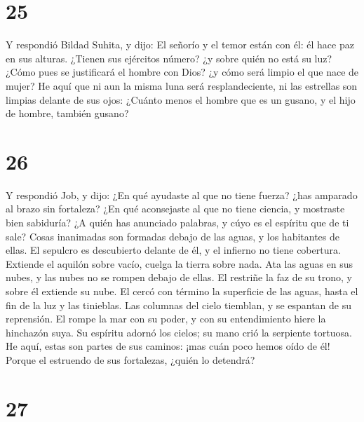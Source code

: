 \hypertarget{section-24}{%
\section{25}\label{section-24}}

 Y respondió Bildad Suhita, y dijo:  El señorío
y el temor están con él: él hace paz en sus alturas. 
¿Tienen sus ejércitos número? ¿y sobre quién no está su luz?
 ¿Cómo pues se justificará el hombre con Dios? ¿y cómo será
limpio el que nace de mujer?  He aquí que ni aun la misma
luna será resplandeciente, ni las estrellas son limpias delante de sus
ojos:  ¿Cuánto menos el hombre que es un gusano, y el hijo
de hombre, también gusano?

\hypertarget{section-25}{%
\section{26}\label{section-25}}

 Y respondió Job, y dijo:  ¿En qué ayudaste al
que no tiene fuerza? ¿has amparado al brazo sin fortaleza? 
¿En qué aconsejaste al que no tiene ciencia, y mostraste bien sabiduría?
 ¿A quién has anunciado palabras, y cúyo es el espíritu que
de ti sale?  Cosas inanimadas son formadas debajo de las
aguas, y los habitantes de ellas.  El sepulcro es
descubierto delante de él, y el infierno no tiene cobertura.
 Extiende el aquilón sobre vacío, cuelga la tierra sobre
nada.  Ata las aguas en sus nubes, y las nubes no se rompen
debajo de ellas.  El restriñe la faz de su trono, y sobre él
extiende su nube.  El cercó con término la superficie de
las aguas, hasta el fin de la luz y las tinieblas.  Las
columnas del cielo tiemblan, y se espantan de su reprensión.
 El rompe la mar con su poder, y con su entendimiento hiere
la hinchazón suya.  Su espíritu adornó los cielos; su mano
crió la serpiente tortuosa.  He aquí, estas son partes de
sus caminos: ¡mas cuán poco hemos oído de él! Porque el estruendo de sus
fortalezas, ¿quién lo detendrá?

\hypertarget{section-26}{%
\section{27}\label{section-26}}

